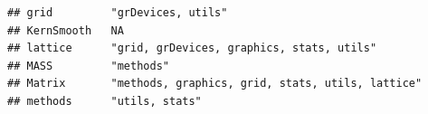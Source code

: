 \documentclass[]{article}
\begin{document}
\begin{verbatim}
## grid         "grDevices, utils"                                                                                                                                                                                                                                                                                                                                                                                                                                                                    
## KernSmooth   NA                                                                                                                                                                                                                                                                                                                                                                                                                                                                                    
## lattice      "grid, grDevices, graphics, stats, utils"                                                                                                                                                                                                                                                                                                                                                                                                                                             
## MASS         "methods"                                                                                                                                                                                                                                                                                                                                                                                                                                                                             
## Matrix       "methods, graphics, grid, stats, utils, lattice"                                                                                                                                                                                                                                                                                                                                                                                                                                      
## methods      "utils, stats"                                                                                                                                                                                                                                                                                                                                                                                                                                                                        

\end{verbatim}
\end{document}

